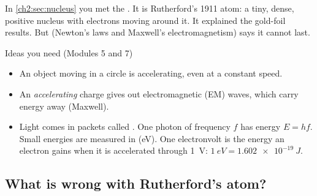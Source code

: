In \cref{ch2:sec:nucleus} you met the . It is Rutherford's 1911 atom: a tiny,
dense, positive nucleus with electrons moving around it. It explained the gold-foil results.
But  (Newton's laws and Maxwell's electromagnetism) says it cannot
last.

\begin{refresher}{Ideas you need (Modules 5 and 7)}
\begin{itemize}
  \item An object moving in a circle is accelerating, even at a constant speed.
  \item An \emph{accelerating} charge gives out electromagnetic (EM) waves, which carry energy
        away (Maxwell).
  \item Light comes in packets called . One photon of frequency $f$ has energy
        $E = hf$. Small energies are measured in  (eV). One electronvolt
        is the energy an electron gains when it is accelerated through \qty{1}{V}:
        $\qty{1}{eV} = \qty{1.602e-19}{J}$.
\end{itemize}
\end{refresher}

\subsection{What is wrong with Rutherford's atom?}

